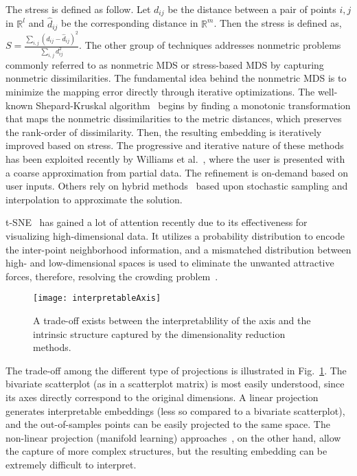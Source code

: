 The stress is defined as follow.
%
Let $d_{ij}$ be the distance between a pair of points $i, j$ in $\mathbb{R}^l$ and $\hat{d}_{ij}$ be the corresponding distance in $\mathbb{R}^m$. Then the stress is defined as, $ S = \frac{\sum_{i,j}(d_{ij}-\hat{d}_{ij})^2}{\sum_{i,j}d_{ij}^2}.$
%
The other group of techniques addresses nonmetric problems commonly referred to as nonmetric MDS or stress-based MDS by capturing nonmetric dissimilarities.
%
The fundamental idea behind the nonmetric MDS is to minimize the mapping error directly through iterative optimizations.
%
The well-known Shepard-Kruskal algorithm~\cite{Kruskal1964} begins by finding a monotonic transformation that maps the nonmetric dissimilarities to the metric distances, which preserves the rank-order of dissimilarity.
%
Then, the resulting embedding is iteratively improved based on stress.
%
The progressive and iterative nature of these methods has been exploited recently by Williams et al.~\cite{WilliamsMunzner2004}, where the user is presented with a coarse approximation from partial data.
%
The refinement is on-demand based on user inputs.
%
Others rely on hybrid methods~\cite{MorrisonRossChalmers2002, MorrisonChalmers2003} based upon stochastic sampling and interpolation to approximate the solution.

t-SNE~\cite{MaatenHinton2008} has gained a lot of attention recently due to its effectiveness for visualizing high-dimensional data.
%
It utilizes a probability distribution to encode the inter-point neighborhood information, and a mismatched distribution between high- and low-dimensional spaces is used to eliminate the unwanted attractive forces, therefore, resolving the crowding problem~\cite{MaatenHinton2008}.

\begin{figure}[!ht]
  \centering
  \texttt{[image: interpretableAxis]}
  \vspace{-2mm}
  \caption{A trade-off exists between the interpretablility of the axis and the intrinsic structure captured by the dimensionality reduction methods.}
  \label{fig:tradeOffProjections}
\end{figure}

The trade-off among the different type of projections is illustrated in Fig.~\ref{fig:tradeOffProjections}.
%
The bivariate scatterplot (as in a scatterplot matrix) is most easily understood, since its axes directly correspond to the original dimensions.
%
A linear projection~\cite{KorenCarmel2003,Jolliffe2005} generates interpretable embeddings (less so compared to a bivariate scatterplot),
and the out-of-samples points can be easily projected to the same space.
%
The non-linear projection (manifold learning) approaches~\cite{TenenbaumSilvaLangford2000, RoweisSaul2000, BelkinNiyogi2003},
on the other hand, allow the capture of more complex structures, but the resulting embedding can be extremely difficult to interpret.
%

